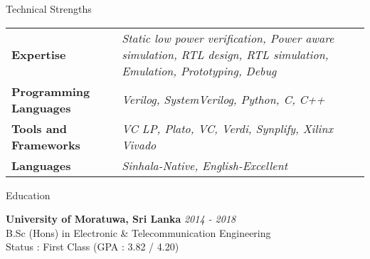 \documentclass[
11pt, %
]{./assets/resume} %
\begin{document}
\begin{rSection}{Technical Strengths}
	
	\def\arraystretch{1.5}
	
	\begin{tabular}{p{2.0in} p{4.5in}}
		\textbf{Expertise} & \emph{Static low power verification, Power aware simulation, RTL design, RTL simulation, Emulation, Prototyping, Debug} \\
		\textbf{Programming Languages} & \emph{Verilog, SystemVerilog, Python, C, C++} \\
		\textbf{Tools and Frameworks} & \emph{VC LP, Plato, VC, Verdi, Synplify, Xilinx Vivado} \\ 
		\textbf{Languages} & \emph{Sinhala-Native, English-Excellent} \\
	\end{tabular}
	
\end{rSection}


\begin{rSection}{Education}
	
	\textbf{University of Moratuwa, Sri Lanka} \hfill \textit{2014 - 2018} \\ 
	B.Sc (Hons) in Electronic \& Telecommunication Engineering \\
	Status : First Class (GPA : 3.82 / 4.20)
	
\end{rSection}

\end{document}
